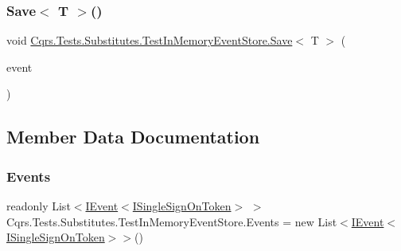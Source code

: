 \mbox{\label{classCqrs_1_1Tests_1_1Substitutes_1_1TestInMemoryEventStore_ac5d70085f30ac4c8be0790bc14de90d3_ac5d70085f30ac4c8be0790bc14de90d3}} 
\subsubsection{\texorpdfstring{Save$<$ T $>$()}{Save< T >()}}
{\footnotesize\ttfamily void \hyperlink{classCqrs_1_1Tests_1_1Substitutes_1_1TestInMemoryEventStore_ad55933a4b148cef3d59c5552038af878_ad55933a4b148cef3d59c5552038af878}{Cqrs.\+Tests.\+Substitutes.\+Test\+In\+Memory\+Event\+Store.\+Save}$<$ T $>$ (\begin{DoxyParamCaption}\item[{\hyperlink{interfaceCqrs_1_1Events_1_1IEvent}{I\+Event}$<$ \hyperlink{interfaceCqrs_1_1Authentication_1_1ISingleSignOnToken}{I\+Single\+Sign\+On\+Token} $>$ @}]{event }\end{DoxyParamCaption})}



\subsection{Member Data Documentation}
\mbox{\label{classCqrs_1_1Tests_1_1Substitutes_1_1TestInMemoryEventStore_add97988e933c2316c445bf4611c2d0ba_add97988e933c2316c445bf4611c2d0ba}} 
\subsubsection{\texorpdfstring{Events}{Events}}
{\footnotesize\ttfamily readonly List$<$\hyperlink{interfaceCqrs_1_1Events_1_1IEvent}{I\+Event}$<$\hyperlink{interfaceCqrs_1_1Authentication_1_1ISingleSignOnToken}{I\+Single\+Sign\+On\+Token}$>$ $>$ Cqrs.\+Tests.\+Substitutes.\+Test\+In\+Memory\+Event\+Store.\+Events = new List$<$\hyperlink{interfaceCqrs_1_1Events_1_1IEvent}{I\+Event}$<$\hyperlink{interfaceCqrs_1_1Authentication_1_1ISingleSignOnToken}{I\+Single\+Sign\+On\+Token}$>$$>$()}

